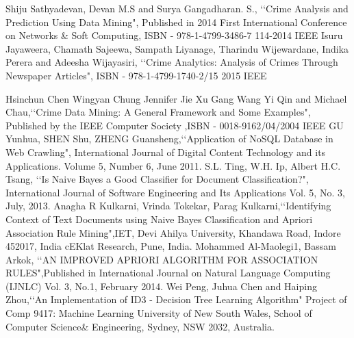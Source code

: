 \documentclass[12pt]{extreport}
\begin{document}
\renewcommand{\bibname}{REFERENCES}
\begin{thebibliography}{11}
 Shiju Sathyadevan, Devan M.S and Surya Gangadharan. S., \lq\lq Crime Analysis and Prediction Using Data Mining", Published in 2014 First International Conference on Networks \& Soft Computing, ISBN - 978-1-4799-3486-7 114-2014 IEEE 
\bibitem {} Isuru Jayaweera, Chamath Sajeewa, Sampath Liyanage, Tharindu Wijewardane, Indika Perera and Adeesha Wijayasiri, \lq\lq Crime Analytics: Analysis of Crimes Through Newspaper Articles", ISBN - 978-1-4799-1740-2/15 2015 IEEE

\bibitem {} Hsinchun Chen Wingyan Chung Jennifer Jie Xu Gang Wang Yi Qin and Michael Chau,\lq\lq Crime Data Mining: A General Framework and Some Examples", Published by the IEEE Computer Society ,ISBN - 0018-9162/04/2004 IEEE
\bibitem{} GU Yunhua, SHEN Shu, ZHENG Guansheng,\lq\lq Application of NoSQL Database in Web Crawling", International Journal of Digital Content Technology and its Applications. Volume 5, Number 6, June 2011.
\bibitem {} S.L. Ting, W.H. Ip, Albert H.C. Tsang, \lq\lq Is Naive Bayes a Good Classifier for Document Classification?", International Journal of Software Engineering and Its Applications Vol. 5, No. 3, July, 2013.
\bibitem {} Anagha R Kulkarni, Vrinda Tokekar, Parag Kulkarni,\lq\lq Identifying Context of Text Documents using Naive Bayes Classification and Apriori Association Rule Mining",IET, Devi Ahilya University, Khandawa Road, Indore 452017, India cEKlat Research, Pune, India.
\bibitem{} Mohammed Al-Maolegi1, Bassam Arkok, \lq\lq AN IMPROVED APRIORI ALGORITHM FOR ASSOCIATION RULES",Published in International Journal on Natural Language Computing (IJNLC) Vol. 3, No.1, February 2014.
\bibitem{} Wei Peng, Juhua Chen and Haiping Zhou,\lq\lq An Implementation of ID3 - Decision Tree Learning Algorithm" Project of Comp 9417: Machine Learning University of New South Wales, School of Computer Science\& Engineering, Sydney, NSW 2032, Australia.
\end{thebibliography}

\newpage
\appendix


\end{document}
